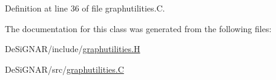 Definition at line 36 of file graphutilities.\+C.



The documentation for this class was generated from the following files\+:\begin{DoxyCompactItemize}
\item 
De\+Si\+G\+N\+A\+R/include/\hyperlink{graphutilities_8_h}{graphutilities.\+H}\item 
De\+Si\+G\+N\+A\+R/src/\hyperlink{graphutilities_8_c}{graphutilities.\+C}\end{DoxyCompactItemize}
